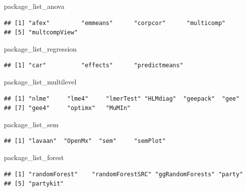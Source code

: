 \documentclass[]{book}
\newenvironment{Shaded}{\begin{snugshade}}{\end{snugshade}}
\newcommand{\NormalTok}[1]{#1}
\theoremstyle{definition}
\theoremstyle{definition}
\theoremstyle{definition}
\theoremstyle{remark}
\begin{document}
\begin{Shaded}
\begin{Highlighting}[]
\NormalTok{package_list_anova}
\end{Highlighting}
\end{Shaded}

\begin{verbatim}
## [1] "afex"         "emmeans"      "corpcor"      "multicomp"   
## [5] "multcompView"
\end{verbatim}

\begin{Shaded}
\begin{Highlighting}[]
\NormalTok{package_list_regression}
\end{Highlighting}
\end{Shaded}

\begin{verbatim}
## [1] "car"          "effects"      "predictmeans"
\end{verbatim}

\begin{Shaded}
\begin{Highlighting}[]
\NormalTok{package_list_multilevel}
\end{Highlighting}
\end{Shaded}

\begin{verbatim}
## [1] "nlme"     "lme4"     "lmerTest" "HLMdiag"  "geepack"  "gee"     
## [7] "gee4"     "optimx"   "MuMIn"
\end{verbatim}

\begin{Shaded}
\begin{Highlighting}[]
\NormalTok{package_list_sem}
\end{Highlighting}
\end{Shaded}

\begin{verbatim}
## [1] "lavaan"  "OpenMx"  "sem"     "semPlot"
\end{verbatim}

\begin{Shaded}
\begin{Highlighting}[]
\NormalTok{package_list_forest}
\end{Highlighting}
\end{Shaded}

\begin{verbatim}
## [1] "randomForest"    "randomForestSRC" "ggRandomForests" "party"          
## [5] "partykit"
\end{verbatim}
\end{document}

